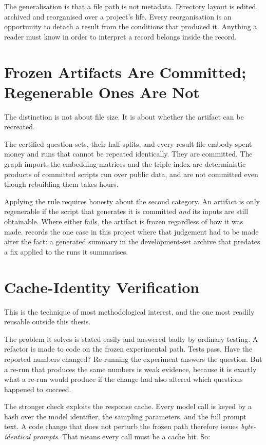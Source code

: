 The generalisation is that a file path is not metadata. Directory layout is
edited, archived and reorganised over a project's life. Every reorganisation
is an opportunity to detach a result from the conditions that produced it.
Anything a reader must know in order to interpret a record belongs inside the
record.

\section{Frozen Artifacts Are Committed; Regenerable Ones Are
Not}\label{app:frozen-vs-regenerable}

The distinction is not about file size. It is about whether the artifact can be
recreated.

The certified question sets, their half-splits, and every result file embody
spent money and runs that cannot be repeated identically. They are committed.
The graph import, the embedding matrices and the triple index are deterministic
products of committed scripts run over public data, and are not committed even
though rebuilding them takes hours.

Applying the rule requires honesty about the second category. An artifact is
only regenerable if the script that generates it is committed \emph{and} its
inputs are still obtainable. Where either fails, the artifact is frozen
regardless of how it was made.  records the one
case in this project where that judgement had to be made after the fact: a
generated summary in the development-set archive that predates a fix applied to
the runs it summarises.

\section{Cache-Identity Verification}\label{app:cache-identity}

This is the technique of most methodological interest, and the one most readily
reusable outside this thesis.

The problem it solves is stated easily and answered badly by ordinary testing. A
refactor is made to code on the frozen experimental path. Tests pass. Have the
reported numbers changed? Re-running the experiment answers the question. But a
re-run that produces the same numbers is weak evidence, because it is exactly
what a re-run would produce if the change had also altered which questions
happened to succeed.

The stronger check exploits the response cache. Every model call is keyed by a
hash over the model identifier, the sampling parameters, and the full prompt
text. A code change that does not perturb the frozen path therefore issues
\emph{byte-identical prompts}. That means every call must be a cache hit. So:

